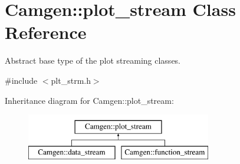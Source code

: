 \hypertarget{a00432}{}\section{Camgen\+:\+:plot\+\_\+stream Class Reference}
\label{a00432}


Abstract base type of the plot streaming classes.  




{\ttfamily \#include $<$plt\+\_\+strm.\+h$>$}

Inheritance diagram for Camgen\+:\+:plot\+\_\+stream\+:\begin{figure}[H]
\begin{center}
\leavevmode
\includegraphics[height=2.000000cm]{a00432}
\end{center}
\end{figure}
